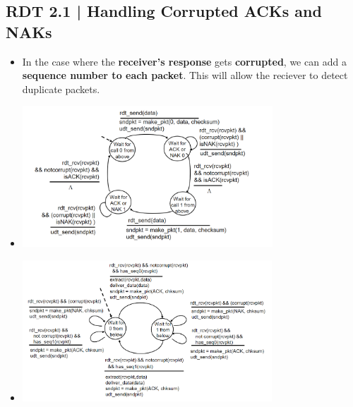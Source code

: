 \documentclass[16pt]{article}
\begin{document}
    \subsection*{RDT 2.1 | Handling Corrupted ACKs and NAKs}
    \begin{itemize}
        \item In the case where the \textbf{receiver's response} gets \textbf{corrupted}, we can add a \textbf{sequence number to each packet}. This will allow the reciever to detect duplicate packets.
        \item[] \begin{center}
                    \includegraphics*[height=200px]{images/RDT-2.1.PNG}
                \end{center}
        \item[] \begin{center}
                   \includegraphics*[height=200px]{images/RDT-2.1-1.PNG}
                \end{center}
    \end{itemize}
\end{document}
